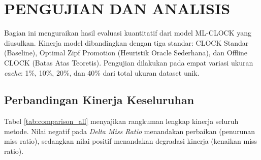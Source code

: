 \chapter{PENGUJIAN DAN ANALISIS}

Bagian ini menguraikan hasil evaluasi kuantitatif dari model ML-CLOCK
yang diusulkan.
Kinerja model dibandingkan dengan tiga standar:
CLOCK Standar (Baseline), Optimal Zipf Promotion (Heuristik Oracle Sederhana),
dan Offline CLOCK (Batas Atas Teoretis).
Pengujian dilakukan pada empat variasi ukuran \textit{cache}: 1\%,
10\%, 20\%, dan 40\%
dari total ukuran dataset unik.

\section{Perbandingan Kinerja Keseluruhan}

Tabel \ref{tab:comparison_all} menyajikan rangkuman lengkap kinerja
seluruh metode.
Nilai negatif pada \textit{Delta Miss Ratio} menandakan perbaikan
(penurunan miss ratio),
sedangkan nilai positif menandakan degradasi kinerja (kenaikan miss ratio).

\begin{table}[htbp]
  \centering
  \caption{Perbandingan Komprehensif: ML-CLOCK vs. Referensi}
  \label{tab:comparison_all}
\end{table}

